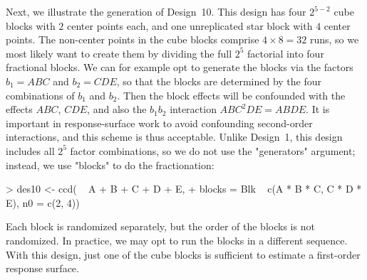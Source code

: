 \documentclass[article,nojss]{jss}
\begin{document}
Next, we illustrate the generation of Design~10.
This design has four $2^{5-2}$ cube blocks with $2$ center points each, and one unreplicated star block with $4$ center points.  The non-center points in the cube blocks comprise $4\times8=32$ runs, so we most likely want to create them by dividing the full $2^5$ factorial into four fractional blocks.  We can for example opt to generate the blocks via the factors $b_1=ABC$ and $b_2=CDE$, so that the blocks are determined by the four combinations of $b_1$ and $b_2$.  Then the block effects will be confounded with the effects $ABC$, $CDE$, and also the $b_1b_2$ interaction $ABC^2DE=ABDE$.  It  is important in response-surface work to avoid confounding second-order interactions, and this scheme is thus acceptable.  Unlike Design~1, this design includes all $2^5$ factor combinations, so we do not use the "generators" argument; instead, we use "blocks" to do the fractionation:
\begin{Schunk}
\begin{Sinput}
> des10 <- ccd( ~ A + B + C + D + E,
+   blocks = Blk ~ c(A * B * C, C * D * E), n0 = c(2, 4))
\end{Sinput}
\end{Schunk}
Each block is randomized separately, but the order of the blocks is not randomized. In practice, we may opt to run the blocks in a different sequence.  
With this design, just one of the cube blocks is sufficient to estimate a first-order response surface.
\end{document}

